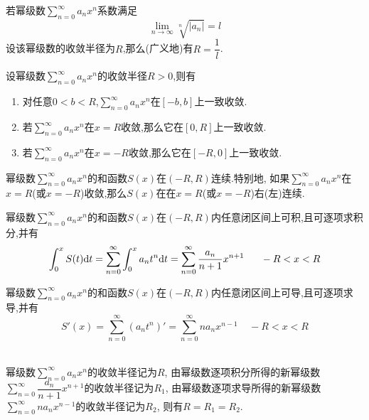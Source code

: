 \documentclass{ctexart}
\begin{document}
\begin{formal}[2.2 基于Cauchy判别法的收敛半径求法]
    若幂级数$\displaystyle\sum_{n=0}^\infty a_nx^n$系数满足
    \[\lim_{n\to\infty}\sqrt[n]{\left|a_n\right|}=l\]
    设该幂级数的收敛半径为$R$,那么(广义地)有$R=\dfrac1l$.
\end{formal}\noindent
{}
\begin{formal}[3.1 幂级数的内闭一致性]
    设幂级数$\displaystyle\sum_{n=0}^\infty a_nx^n$的收敛半径$R>0$,则有
    \begin{enumerate}[label=\tbf{\arabic*.}]
        \item 对任意$0<b<R$,$\displaystyle\sum_{n=0}^\infty a_nx^n$在$[-b,b]$上一致收敛.
        \item 若$\displaystyle\sum_{n=0}^\infty a_nx^n$在$x=R$收敛,那么它在$[0,R]$上一致收敛.
        \item 若$\displaystyle\sum_{n=0}^\infty a_nx^n$在$x=-R$收敛,那么它在$[-R,0]$上一致收敛.
    \end{enumerate}
\end{formal}
\begin{formal}[3.2 幂级数的连续性]
    幂级数$\displaystyle\sum_{n=0}^\infty a_nx^n$的和函数$S(x)$在$(-R,R)$连续.特别地,%
    如果$\displaystyle\sum_{n=0}^\infty a_nx^n$在$x=R$(或$x=-R$)收敛,那么$S(x)$在在$x=R$(或$x=-R$)右(左)连续.
\end{formal}
\begin{formal}[3.3 幂级数的和函数的逐项积分]
    幂级数$\displaystyle\sum_{n=0}^\infty a_nx^n$的和函数$S(x)$在$(-R,R)$内任意闭区间上可积,且可逐项求积分,并有
    \[\int_0^xS(t)\di t=\sum_{n=0}^\infty\int_0^xa_nt^n\di t=\sum_{n=0}^\infty\dfrac{a_n}{n+1}x^{n+1}\ \ \ \ \ -R<x<R\]
\end{formal}
\begin{formal}[3.4 幂级数的和函数的逐项求导]
    幂级数$\displaystyle\sum_{n=0}^\infty a_nx^n$的和函数$S(x)$在$(-R,R)$内任意闭区间上可导,且可逐项求导,并有
    \[S'(x)=\sum_{n=0}^\infty\left(a_nt^n\right)'=\sum_{n=0}^\infty na_nx^{n-1}\ \ \ \ \ -R<x<R\]
\end{formal}
\begin{lemma}\\
    幂级数$\displaystyle\sum_{n=0}^\infty a_nx^n$的收敛半径记为$R$,%
    由幂级数逐项积分所得的新幂级数$\displaystyle\sum_{n=0}^\infty\dfrac{a_n}{n+1}x^{n+1}$的收敛半径记为$R_1$,%
    由幂级数逐项求导所得的新幂级数$\displaystyle\sum_{n=0}^\infty na_nx^{n-1}$的收敛半径记为$R_2$,%
    则有$R=R_1=R_2$.
\end{lemma}
\end{document}
